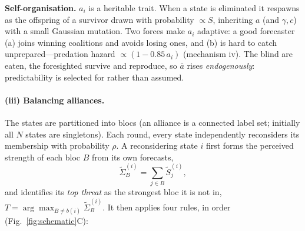 \documentclass[11pt]{article}
\begin{document}
\textbf{Self-organisation.} $a_i$ is a heritable trait. When a state is
eliminated it respawns as the offspring of a survivor drawn with probability
$\propto S$, inheriting $a$ (and $\gamma,c$) with a small Gaussian mutation. Two
forces make $a_i$ adaptive: a good forecaster (a) joins winning coalitions and
avoids losing ones, and (b) is hard to catch unprepared---predation hazard
$\propto(1-0.85\,a_i)$ (mechanism iv). The blind are eaten, the foresighted
survive and reproduce, so $\bar a$ rises \emph{endogenously}: predictability is
selected for rather than assumed.

\paragraph{(iii) Balancing alliances.} The states are partitioned into blocs
(an alliance is a connected label set; initially all $N$ states are singletons).
Each round, every state independently reconsiders its membership with probability
$\rho$. A reconsidering state $i$ first forms the perceived strength of each bloc
$B$ from its own forecasts,
\begin{equation}
\tilde\Sigma^{(i)}_B=\sum_{j\in B}\tilde S^{(i)}_j,
\end{equation}
and identifies its \emph{top threat} as the strongest bloc it is not in,
$T=\arg\max_{B\neq b(i)}\tilde\Sigma^{(i)}_B$. It then applies four rules, in
order (Fig.~\ref{fig:schematic}C):
\end{document}

